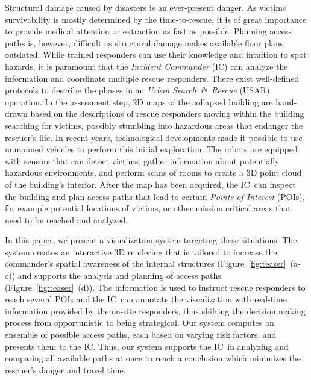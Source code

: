 \documentclass[conference,10pt,letter]{IEEEtran}
\def\IC{IC}
\begin{document}
Structural damage caused by disasters is an ever-present danger. As victims' survivability is mostly determined by the time-to-rescue, it is of great importance to provide medical attention or extraction as fast as possible. Planning access paths is, however, difficult as structural damage makes available floor plans outdated. While trained responders can use their knowledge and intuition to spot hazards, it is paramount that the \emph{Incident Commander} (IC) can analyze the information and coordinate multiple rescue responders. There exist well-defined protocols to describe the phases in an \emph{Urban Search~\&~Rescue} (USAR) operation. In the assessment step, 2D maps of the collapsed building are hand-drawn based on the descriptions of rescue responders moving within the building searching for victims, possibly stumbling into hazardous areas that endanger the rescuer's life. In recent years, technological developments made it possible to use unmanned vehicles to perform this initial exploration. The robots are equipped with sensors that can detect victims, gather information about potentially hazardous environments, and perform scans of rooms to create a 3D point cloud of the building's interior. After the map has been acquired, the \IC\ can inspect the building and plan access paths that lead to certain \emph{Points of Interest} (POIs), for example potential locations of victims, or other mission critical areas that need to be reached and analyzed.

In this paper, we present a visualization system targeting these situations. The system creates an interactive 3D rendering that is tailored to increase the commander's spatial awareness of the internal structures (Figure~\ref{fig:teaser}~(a-c)) and supports the analysis and planning of access paths (Figure~\ref{fig:teaser}~(d)). The information is used to instruct rescue responders to reach several POIs and the \IC\ can annotate the visualization with real-time information provided by the on-site responders, thus shifting the decision making process from opportunistic to being strategical. Our system computes an ensemble of possible access paths, each based on varying risk factors, and presents them to the \IC . Thus, our system supports the \IC\ in analyzing and comparing all available paths at once to reach a conclusion which minimizes the rescuer's danger and travel time.

\end{document}
